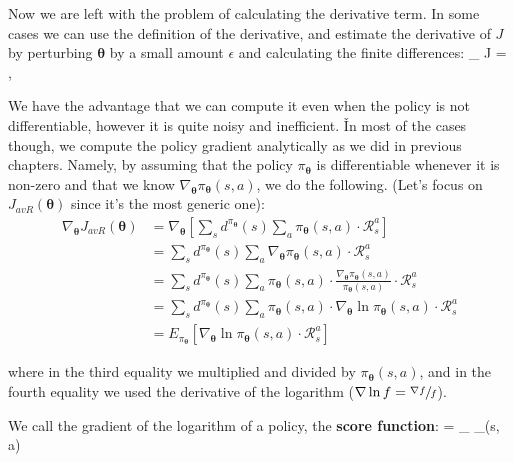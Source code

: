 Now we are left with the problem of calculating the derivative term. In some cases we can use the definition of the
derivative, and estimate the derivative of $J$ by perturbing $\boldsymbol{\theta}$ by a small amount $\epsilon$ and
calculating the finite differences:
\bse
\nabla_{\boldsymbol{\theta}} J = ,
\qquad \epsilon {}
\ese

We have the advantage that we can compute it even when the policy is not differentiable, however it is quite noisy
and inefficient. \v

In most of the cases though, we compute the policy gradient analytically as we did in previous chapters. Namely, by
assuming that the policy $\pi_{\boldsymbol{\theta}}$ is differentiable whenever it is non-zero and that we know
$\nabla_{\boldsymbol{\theta}} \pi_{\boldsymbol{\theta}}(s,a)$, we do the following. (Let's focus on
$J_{avR}(\boldsymbol{\theta})$ since it's the most generic one):
{\setlength{\jot}{10pt}
\begin{align*}
\nabla_{\boldsymbol{\theta}} J_{avR}(\boldsymbol{\theta}) &= \nabla_{\boldsymbol{\theta}} \left[ \sum_{s}
d^{\pi_{\boldsymbol{\theta}}}(s) \sum_{a} \pi_{\boldsymbol{\theta}}(s, a) \cdot \mathcal{R}_{s}^{a} \right] \\
&= \sum_{s} d^{\pi_{\boldsymbol{\theta}}}(s) \sum_{a} \nabla_{\boldsymbol{\theta}}
\pi_{\boldsymbol{\theta}}(s, a) \cdot \mathcal{R}_{s}^{a} \\
&= \sum_{s} d^{\pi_{\boldsymbol{\theta}}}(s) \sum_{a} \pi_{\boldsymbol{\theta}}(s, a) \cdot
\frac{\nabla_{\boldsymbol{\theta}} \pi_{\boldsymbol{\theta}}(s, a)}{\pi_{\boldsymbol{\theta}}(s, a)} \cdot
\mathcal{R}_{s}^{a} \\
&= \sum_{s} d^{\pi_{\boldsymbol{\theta}}}(s) \sum_{a} \pi_{\boldsymbol{\theta}}(s, a) \cdot
\nabla_{\boldsymbol{\theta}} \ln \pi_{\boldsymbol{\theta}}(s, a) \cdot \mathcal{R}_{s}^{a} \\
&= E_{\pi_{\boldsymbol{\theta}}} \left[ \nabla_{\boldsymbol{\theta}} \ln \pi_{\boldsymbol{\theta}}(s, a) \cdot
\mathcal{R}_{s}^{a} \right]
\end{align*}}

\vspace{-10pt}

where in the third equality we multiplied and divided by $\pi_{\boldsymbol{\theta}}(s, a)$, and in the fourth
equality we used the derivative of the logarithm ($\nabla \ln f = \sfrac{\nabla f}{f}$).

We call the gradient of the logarithm of a policy, the \textbf{score function}:
\bse
{} = \nabla_{\boldsymbol{\theta}} \ln \pi_{\boldsymbol{\theta}}(s, a)
\ese

